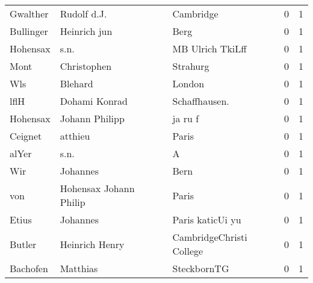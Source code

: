 \begin{center}
\begin{tiny}
\begin{longtabu}{llllrr}
                 Gwalther &                        Rudolf d.J. &             &                                   Cambridge &          0 &         1 \\
                Bullinger &                       Heinrich jun &             &                                        Berg &          0 &         1 \\
                 Hohensax &                               s.n. &             &                            MB Ulrich TkiLff &          0 &         1 \\
                     Mont &                        Christophen &             &                                    Strahurg &          0 &         1 \\
                      Wls &                            Blehard &             &                                      London &          0 &         1 \\
                     lflH &                      Dohami Konrad &             &                              Schaffhausen.  &          0 &         1 \\
                 Hohensax &                     Johann Philipp &             &                                     ja ru f &          0 &         1 \\
                  Ceignet &                            atthieu &             &                                       Paris &          0 &         1 \\
                    alYer &                               s.n. &             &                                           A &          0 &         1 \\
                      Wir &                           Johannes &             &                                        Bern &          0 &         1 \\
                      von &             Hohensax Johann Philip &             &                                       Paris &          0 &         1 \\
                    Etius &                           Johannes &             &                            Paris katicUi yu &          0 &         1 \\
                   Butler &                     Heinrich Henry &             &                    CambridgeChristi College &          0 &         1 \\
                 Bachofen &                           Matthias &             &                                 SteckbornTG &          0 &         1 \\

\end{longtabu}
\end{tiny}
\end{center}
